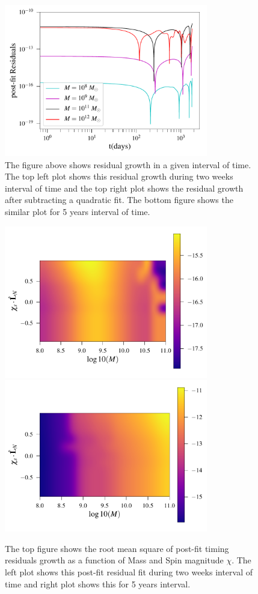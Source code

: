 \documentclass[twocolumn,showpacs,aps,prd,nobibnotes,floatfix]{revtex4-1}
\begin{document}
\begin{widetext}
\begin{figure}
	\includegraphics[width=3.5in]{../plots/PlotfromMathematicaData/ResidualGrowth5YearsDiffSpinsInDaysPostfit.pdf}
	\caption{The figure above shows residual growth in a given interval of time. The top left plot shows this residual growth during two weeks interval of time and the top right plot shows the residual growth after subtracting a quadratic fit. The bottom figure shows the similar plot for 5 years interval of time.}
	\label{fig:resedualGrowthLogLog}
\end{figure} 

\begin{figure}
	\includegraphics[width=3.5in]{../plots/PlotfromMathematicaData/MemoryResSpinvsMass14Days.pdf}
	\includegraphics[width=3.5in]{../plots/PlotfromMathematicaData/MemoryResSpinvsMass1825Days.pdf}
	\caption{The top figure shows the root mean square of post-fit timing residuals growth as a function of Mass and Spin magnitude $\chi$. The left plot shows this post-fit residual fit during two weeks interval of time and right plot shows this for 5 years interval.}
	\label{fig:MemoryMassVsSpin}
\end{figure}
\end{widetext}
\end{document}
